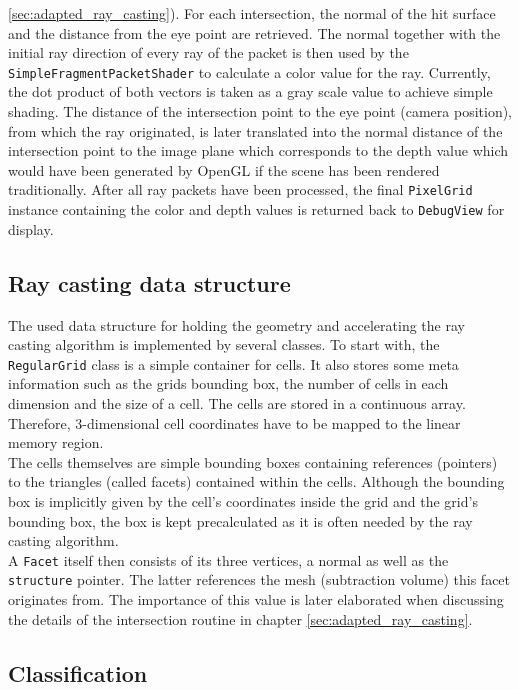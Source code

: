 \ref{sec:adapted_ray_casting}). For each intersection, the normal of the hit surface and the distance from the eye point are retrieved. The normal together with the initial ray direction of every ray of the packet is then used by the \lstinline!SimpleFragmentPacketShader! to calculate a color value for the ray. Currently, the dot product of both vectors is taken as a gray scale value to achieve simple shading. The distance of the intersection point to the eye point (camera position), from which the ray originated, is later translated into the normal distance of the intersection point to the image plane which corresponds to the depth value which would have been generated by OpenGL if the scene has been rendered traditionally. After all ray packets have been processed, the final \lstinline!PixelGrid! instance containing the color and depth values is returned back to \lstinline!DebugView! for display.

\subsection{Ray casting data structure}
\label{sec:data_structure}

The used data structure for holding the geometry and accelerating the ray casting algorithm is implemented by several classes. To start with, the \lstinline!RegularGrid! class is a simple container for cells. It also stores some meta information such as the grids bounding box, the number of cells in each dimension and the size of a cell. The cells are stored in a continuous array. Therefore, 3-dimensional cell coordinates have to be mapped to the linear memory region. \\
The cells themselves are simple bounding boxes containing references (pointers) to the triangles (called facets) contained within the cells. Although the bounding box is implicitly given by the cell's coordinates inside the grid and the grid's bounding box, the box is kept precalculated as it is often needed by the ray casting algorithm. \\
A \lstinline!Facet! itself then consists of its three vertices, a normal as well as the \lstinline!structure! pointer. The latter references the mesh (subtraction volume) this facet originates from. The importance of this value is later elaborated when discussing the details of the intersection routine in chapter \ref{sec:adapted_ray_casting}.

\subsection{Classification}
\label{sec:classification}



